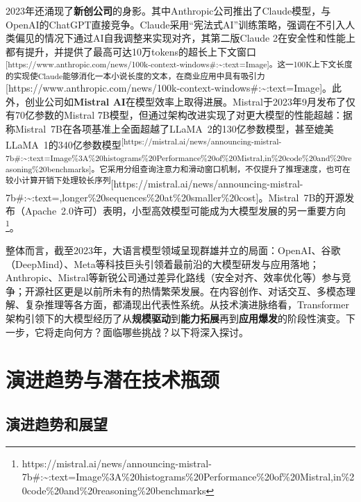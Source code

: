 \documentclass[
  letterpaper,
]{scrbook}
\begin{document}
2023年还涌现了\textbf{新创公司}的身影。其中Anthropic公司推出了Claude模型，与OpenAI的ChatGPT直接竞争。Claude采用``宪法式AI''训练策略，强调在不引入人类偏见的情况下通过AI自我调整来实现对齐，其第二版Claude
2在安全性和性能上都有提升，并提供了最高可达10万tokens的超长上下文窗口\textsuperscript{{[}https://www.anthropic.com/news/100k-context-windows\#:\textasciitilde:text=Image{]}。这一100K上下文长度的实现使Claude能够消化一本小说长度的文本，在商业应用中具有吸引力}{[}https://www.anthropic.com/news/100k-context-windows\#:\textasciitilde:text=Image{]}。此外，创业公司如\textbf{Mistral
AI}在模型效率上取得进展。Mistral于2023年9月发布了仅有70亿参数的Mistral
7B模型，但通过架构改进实现了对更大模型的性能超越：据称Mistral~7B在各项基准上全面超越了LLaMA~2的130亿参数模型，甚至媲美LLaMA~1的340亿参数模型\textsuperscript{{[}https://mistral.ai/news/announcing-mistral-7b\#:\textasciitilde:text=Image\%3A\%20histograms\%20Performance\%20of\%20Mistral,in\%20code\%20and\%20reasoning\%20benchmarks{]}。它采用分组查询注意力和滑动窗口机制，不仅提升了推理速度，也可在较小计算开销下处理较长序列}{[}https://mistral.ai/news/announcing-mistral-7b\#:\textasciitilde:text=,longer\%20sequences\%20at\%20smaller\%20cost{]}。Mistral~7B的开源发布（Apache~2.0许可）表明，小型高效模型可能成为大模型发展的另一重要方向\footnote{https://mistral.ai/news/announcing-mistral-7b\#:\textasciitilde:text=Image\%3A\%20histograms\%20Performance\%20of\%20Mistral,in\%20code\%20and\%20reasoning\%20benchmarks}。

整体而言，截至2023年，大语言模型领域呈现群雄并立的局面：OpenAI、谷歌（DeepMind）、Meta等科技巨头引领着最前沿的大模型研发与应用落地；Anthropic、Mistral等新锐公司通过差异化路线（安全对齐、效率优化等）参与竞争；开源社区更是以前所未有的热情繁荣发展。在内容创作、对话交互、多模态理解、复杂推理等各方面，都涌现出代表性系统。从技术演进脉络看，Transformer架构引领下的大模型经历了从\textbf{规模驱动}到\textbf{能力拓展}再到\textbf{应用爆发}的阶段性演变。下一步，它将走向何方？面临哪些挑战？以下将深入探讨。

\section{演进趋势与潜在技术瓶颈}\label{ux6f14ux8fdbux8d8bux52bfux4e0eux6f5cux5728ux6280ux672fux74f6ux9888}

\subsection{演进趋势和展望}\label{ux6f14ux8fdbux8d8bux52bfux548cux5c55ux671b}
\end{document}
